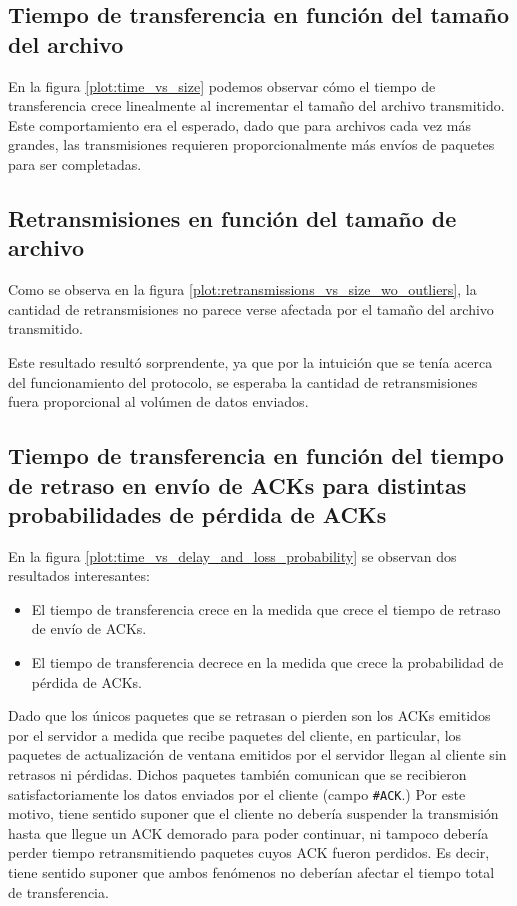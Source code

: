 \documentclass[a4paper, 10pt, twoside]{article}
\newcommand{\ack}{\texttt{\#ACK}\xspace}
\begin{document}
\subsection{Tiempo de transferencia en función del tamaño del archivo}

En la figura \ref{plot:time_vs_size} podemos observar cómo el tiempo de transferencia crece linealmente al incrementar el tamaño del archivo transmitido. Este comportamiento era el esperado, dado que para archivos cada vez más grandes, las transmisiones requieren proporcionalmente más envíos de paquetes para ser completadas.


\subsection{Retransmisiones en función del tamaño de archivo}

Como se observa en la figura \ref{plot:retransmissions_vs_size_wo_outliers}, la cantidad de retransmisiones no parece verse afectada por el tamaño del archivo transmitido. 

Este resultado resultó sorprendente, ya que por la intuición que se tenía acerca del funcionamiento del protocolo, se esperaba la cantidad de retransmisiones fuera proporcional al volúmen de datos enviados.


\subsection{Tiempo de transferencia en función del tiempo de retraso en envío de ACKs para distintas probabilidades de pérdida de ACKs}

En la figura \ref{plot:time_vs_delay_and_loss_probability} se observan dos resultados interesantes:

\begin{itemize}
  \item El tiempo de transferencia crece en la medida que crece el tiempo de retraso de envío de ACKs.

  \item El tiempo de transferencia decrece en la medida que crece la probabilidad de pérdida de ACKs.
\end{itemize}

Dado que los únicos paquetes que se retrasan o pierden son los ACKs emitidos por el servidor a medida que recibe paquetes del cliente, en particular, los paquetes de actualización de ventana emitidos por el servidor llegan al cliente sin retrasos ni pérdidas. Dichos paquetes también comunican que se recibieron satisfactoriamente los datos enviados por el cliente (campo \ack.) Por este motivo, tiene sentido suponer que el cliente no debería suspender la transmisión hasta que llegue un ACK demorado para poder continuar, ni tampoco debería perder tiempo retransmitiendo paquetes cuyos ACK fueron perdidos. Es decir, tiene sentido suponer que ambos fenómenos no deberían afectar el tiempo total de transferencia.
\end{document}
